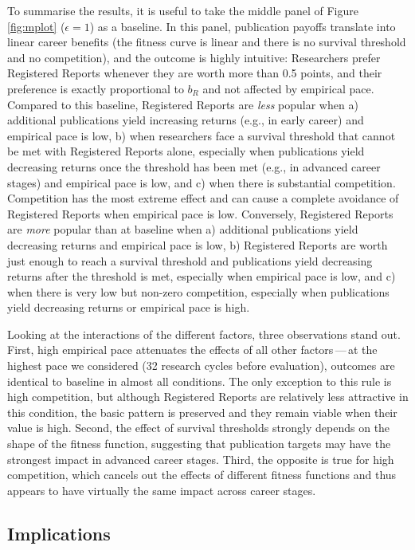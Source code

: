 \documentclass[
  ,man,mask,floatsintext]{apa6}
\begin{document}
To summarise the results, it is useful to take
the middle panel of Figure \ref{fig:mplot} (\(\epsilon = 1\)) as a baseline.
In this panel, publication payoffs translate into linear career benefits (the fitness curve is linear and there is no survival threshold and no competition), and the outcome is highly intuitive:
Researchers prefer Registered Reports whenever they are worth more than 0.5 points, and their preference is exactly proportional to \(b_{R}\) and not affected by empirical pace.
Compared to this baseline, Registered Reports are \emph{less} popular when a) additional publications yield increasing returns (e.g., in early career) and empirical pace is low, b) when researchers face a survival threshold that cannot be met with Registered Reports alone, especially when publications yield decreasing returns once the threshold has been met (e.g., in advanced career stages) and empirical pace is low, and c) when there is substantial competition.
Competition has the most extreme effect and can cause a complete avoidance of Registered Reports when empirical pace is low.
Conversely, Registered Reports are \emph{more} popular than at baseline when a) additional publications yield decreasing returns and empirical pace is low, b) Registered Reports are worth just enough to reach a survival threshold and publications yield decreasing returns after the threshold is met, especially when empirical pace is low, and c) when there is very low but non-zero competition, especially when publications yield decreasing returns or empirical pace is high.

Looking at the interactions of the different factors, three observations stand out.
First, high empirical pace attenuates the effects of all other factors\(\,\)---\(\,\)at the highest pace we considered (32 research cycles before evaluation), outcomes are identical to baseline in almost all conditions.
The only exception to this rule is high competition, but although Registered Reports are relatively less attractive in this condition, the basic pattern is preserved and they remain viable when their value is high.
Second, the effect of survival thresholds strongly depends on the shape of the fitness function, suggesting that publication targets may have the strongest impact in advanced career stages.
Third, the opposite is true for high competition, which cancels out the effects of different fitness functions and thus appears to have virtually the same impact across career stages.

\hypertarget{implications}{%
\subsection{Implications}\label{implications}}
\end{document}
